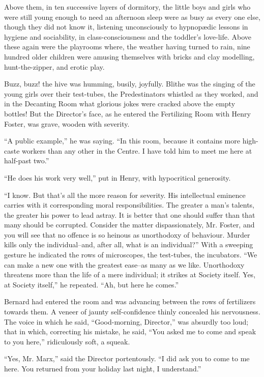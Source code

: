 \documentclass[12pt]{report}
\begin{document}
Above them, in ten successive layers of dormitory, the little boys and
girls who were still young enough to need an afternoon sleep were as
busy as every one else, though they did not know it, listening
unconsciously to hypnopædic lessons in hygiene and sociability, in
class-consciousness and the toddler's love-life. Above these again were
the playrooms where, the weather having turned to rain, nine hundred
older children were amusing themselves with bricks and clay modelling,
hunt-the-zipper, and erotic play.

Buzz, buzz! the hive was humming, busily, joyfully. Blithe was the
singing of the young girls over their test-tubes, the Predestinators
whistled as they worked, and in the Decanting Room what glorious jokes
were cracked above the empty bottles! But the Director's face, as he
entered the Fertilizing Room with Henry Foster, was grave, wooden with
severity.

``A public example,'' he was saying. ``In this room, because it contains
more high-caste workers than any other in the Centre. I have told him to
meet me here at half-past two.''

``He does his work very well,'' put in Henry, with hypocritical
generosity.

``I know. But that's all the more reason for severity. His intellectual
eminence carries with it corresponding moral responsibilities. The
greater a man's talents, the greater his power to lead astray. It is
better that one should suffer than that many should be corrupted.
Consider the matter dispassionately, Mr. Foster, and you will see that
no offence is so heinous as unorthodoxy of behaviour. Murder kills only
the individual--and, after all, what is an individual?'' With a sweeping
gesture he indicated the rows of microscopes, the test-tubes, the
incubators. ``We can make a new one with the greatest ease--as many as
we like. Unorthodoxy threatens more than the life of a mere individual;
it strikes at Society itself. Yes, at Society itself,'' he repeated.
``Ah, but here he comes.''

Bernard had entered the room and was advancing between the rows of
fertilizers towards them. A veneer of jaunty self-confidence thinly
concealed his nervousness. The voice in which he said, ``Good-morning,
Director,'' was absurdly too loud; that in which, correcting his
mistake, he said, ``You asked me to come and speak to you here,''
ridiculously soft, a squeak.

``Yes, Mr. Marx,'' said the Director portentously. ``I did ask you to
come to me here. You returned from your holiday last night, I
understand.''
\end{document}
